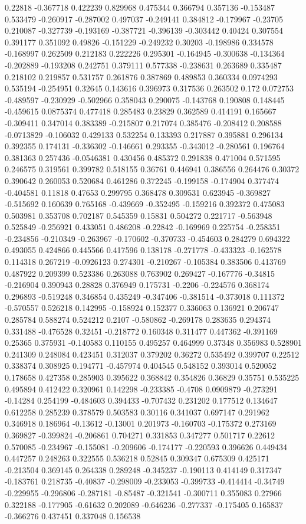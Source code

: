 0.22818 -0.367718 0.422239 0.829968 0.475344 0.366794 0.357136 -0.153487 0.533479 -0.260917 -0.287002 0.497037 -0.249141 0.384812 -0.179967 -0.23705 0.210087 -0.327739 -0.193169 -0.387721 -0.396139 -0.303442 0.40424 0.307554 0.391177 0.351092 0.49826 -0.151229 -0.249232 0.30203 -0.198986 0.334578 -0.168997 0.262509 0.212183 0.222226 0.295301 -0.164945 -0.300638 -0.134364 -0.202889 -0.193208 0.242751 0.379111 0.577338 -0.238631 0.263689 0.335487 0.218102 0.219857 0.531757 0.261876 0.387869 0.489853 0.360334 0.0974293 0.535194 -0.254951 0.32645 0.143616 0.396973 0.317536 0.263502 0.172 0.072753 -0.489597 -0.230929 -0.502966 0.358043 0.290075 -0.143768 0.190808 0.148445 -0.459615 0.0875374 0.477418 0.285483 0.23829 0.362589 0.414191 0.165667 -0.309411 0.347014 0.383389 -0.215807 0.217074 0.385476 -0.208412 0.208588 -0.0713829 -0.106032 0.429133 0.532254 0.133393 0.217887 0.395881 0.296134 0.392355 0.174131 -0.336302 -0.146661 0.293355 -0.343012 -0.280561 0.196764 0.381363 0.257436 -0.0546381 0.430456 0.485372 0.291838 0.471004 0.571595 0.246575 0.319561 0.399782 0.518155 0.36761 0.446941 0.386556 0.264476 0.30372 0.390642 0.260053 0.520684 0.461286 0.372245 -0.199158 -0.174904 0.377474 -0.404581 0.11818 0.47653 0.299795 0.368478 0.309531 0.623945 -0.369827 -0.515692 0.160639 0.765168 -0.439669 -0.352495 -0.159216 0.392372 0.475083 0.503981 0.353708 0.702187 0.545359 0.15831 0.504272 0.221717 -0.563948 0.525849 -0.256921 0.433051 0.486208 -0.22842 -0.169969 0.225754 -0.258351 -0.234856 -0.210349 -0.263967 -0.170602 -0.370733 -0.454603 0.284279 0.694322 0.493055 0.424866 0.445566 0.417596 0.138178 -0.271778 -0.433323 -0.162578 0.114318 0.267219 -0.0926123 0.274301 -0.210267 -0.105384 0.383506 0.413769 0.487922 0.209399 0.523386 0.263088 0.763902 0.269427 -0.167776 -0.34815 -0.216904 0.390943 0.28828 0.376949 0.175731 -0.2206 -0.224576 0.368174 0.296893 -0.519248 0.346854 0.435249 -0.347406 -0.381514 -0.373018 0.111372 -0.570557 0.526218 0.142995 -0.158924 0.152377 0.336063 0.136921 0.206747 0.285784 0.588274 0.524212 0.2107 -0.580862 -0.269178 0.283635 0.294374 0.331488 -0.476528 0.32451 -0.218772 0.160348 0.311477 0.447362 -0.391169 0.25365 0.375931 -0.140583 0.110155 0.495257 0.464999 0.37348 0.356983 0.528901 0.241309 0.248084 0.423451 0.312037 0.379202 0.36272 0.535492 0.399707 0.22512 0.338374 0.308925 0.194771 -0.457974 0.404545 0.548152 0.393014 0.520052 0.178658 0.427358 0.285903 0.395622 0.368842 0.354826 0.36829 0.35751 0.535225 0.495894 0.412422 0.320961 0.142298 -0.233385 -0.4708 0.0909879 -0.273291 -0.14284 0.254199 -0.484603 0.394433 -0.707432 0.231202 0.177512 0.134647 0.612258 0.285239 0.378579 0.503583 0.30116 0.341037 0.697147 0.291962 0.346918 0.186964 -0.13612 -0.13001 0.201973 -0.160703 -0.175372 0.273169 0.369827 -0.399824 -0.206861 0.704271 0.331853 0.347277 0.501717 0.22612 0.570085 -0.234967 -0.155081 -0.209606 -0.174177 -0.220593 0.396626 0.449434 0.447257 0.248263 0.322555 0.536218 0.52845 0.309347 0.675309 0.425171 -0.213504 0.369145 0.264338 0.289248 -0.345237 -0.190113 0.414149 0.317347 -0.183761 0.218735 -0.40837 -0.298009 -0.233053 -0.399733 -0.414414 -0.34749 -0.229955 -0.296806 -0.287181 -0.85487 -0.321541 -0.300711 0.355083 0.27966 0.322188 -0.177905 -0.61632 0.202089 -0.646236 -0.277337 -0.175405 0.165837 -0.366276 0.437451 0.337048 0.156538 